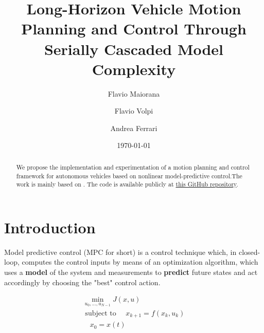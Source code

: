 \documentclass[a4paper, onecolumn, 12pt]{article}
\title{Long-Horizon Vehicle Motion Planning and Control Through Serially Cascaded Model Complexity}
\author{Flavio Maiorana \and Flavio Volpi \and Andrea Ferrari}
\date{\today}
\begin{document}
\maketitle
\begin{abstract}
    We propose the implementation and experimentation of a motion planning and
    control framework for autonomous vehicles based on nonlinear
    model-predictive control.The work is mainly based on \cite{paper}. The code
    is available publicly at
    \href{https://github.com/neverorfrog/vehicle-control}{this GitHub
    repository}. 
\end{abstract}

\newpage
\tableofcontents

\newpage
\section{Introduction}

Model predictive control (MPC for short) is a control technique which, in
closed-loop, computes the control inputs by means of an optimization algorithm,
which uses a \textbf{model} of the system and measurements to \textbf{predict}
future states and act accordingly by choosing the "best" control action. 

\begin{equation}
\begin{aligned}
    \min_{u_0,...,u_{N-1}}{J(x,u)} \\
    \text{ subject to }
        \quad x_{k+1} = f(x_k,u_k) \\
        \quad x_0 = x(t)
        \quad 
\end{aligned}
\end{equation}
\end{document}
